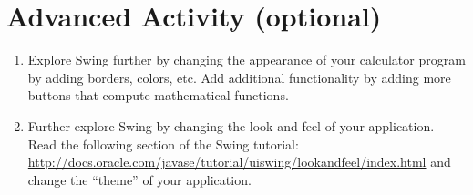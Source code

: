 \documentclass[12pt]{scrartcl}
\begin{document}
\section{Advanced Activity (optional)}

\begin{enumerate}
  \item Explore Swing further by changing the appearance of your calculator 
	program by adding borders, colors, etc.  Add additional functionality by adding 
	more buttons that compute mathematical functions.
  \item Further explore Swing by changing the look and feel of your application.  
	Read the following section of the Swing tutorial: \url{http://docs.oracle.com/javase/tutorial/uiswing/lookandfeel/index.html} 		and change the ``theme'' of your application.
\end{enumerate}

	
\end{document}
